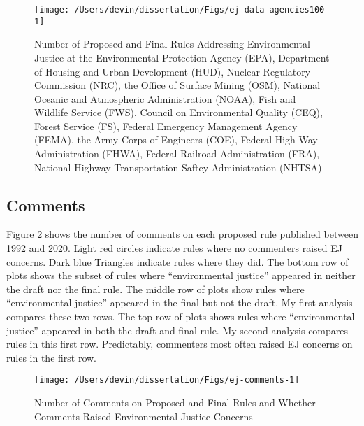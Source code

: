 \documentclass[
      12pt,
        ]{article}
\begin{document}
\begin{figure}

{\centering \texttt{[image: /Users/devin/dissertation/Figs/ej-data-agencies100-1]} 

}

\caption{Number of Proposed and Final Rules Addressing Environmental Justice at the Environmental Protection Agency (EPA), Department of Housing and Urban Development (HUD), Nuclear Regulatory Commission (NRC), the Office of Surface Mining (OSM), National Oceanic and Atmospheric Administration (NOAA), Fish and Wildlife Service (FWS), Council on Environmental Quality (CEQ), Forest Service (FS), Federal Emergency Management Agency (FEMA), the Army Corps of Engineers (COE), Federal High Way Administration (FHWA), Federal Railroad Administration (FRA), National Highway Transportation Saftey Administration (NHTSA)}\label{fig:ej-data-agencies100}
\end{figure}

\hypertarget{comments}{%
\subsection{Comments}\label{comments}}

Figure \ref{fig:ej-comments} shows the number of comments on each proposed rule published between 1992 and 2020. Light red circles indicate rules where no commenters raised EJ concerns. Dark blue Triangles indicate rules where they did. The bottom row of plots shows the subset of rules where ``environmental justice'' appeared in neither the draft nor the final rule. The middle row of plots show rules where ``environmental justice'' appeared in the final but not the draft. My first analysis compares these two rows. The top row of plots shows rules where ``environmental justice'' appeared in both the draft and final rule. My second analysis compares rules in this first row. Predictably, commenters most often raised EJ concerns on rules in the first row.

\begin{figure}

{\centering \texttt{[image: /Users/devin/dissertation/Figs/ej-comments-1]} 

}

\caption{Number of Comments on Proposed and Final Rules and Whether Comments Raised Environmental Justice Concerns}\label{fig:ej-comments}
\end{figure}
\end{document}
